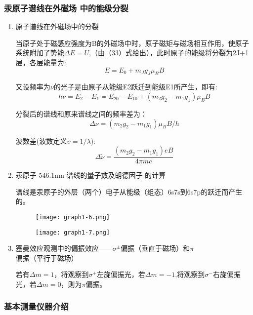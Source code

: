 \documentclass[dvipsnames, svgnames,a4paper,11pt]{article}
\begin{document}
	\subsubsection{汞原子谱线在外磁场 中的能级分裂}

		\begin{enumerate}
			\item 原子谱线在外磁场中的分裂

				当原子处于磁感应强度为B的外磁场中时，原子磁矩与磁场相互作用，使原子系统附加了势能$\Delta E=U$,（由（33）式给出），此时原子的能级将分裂为2J+1层，各层能量为:
				\[
					E = E_0 +m_J g_J \mu_B B
				\]

				又设频率为$\nu$的光子是由原子从能级E2跃迁到能级E1所产生，即有:
				\[
					h\nu = E_2 - E_1 = E_{20} - E_{10} + (m_2 g_2 -m_1 g_1)\mu_B B	
				\]

				分裂后的谱线和原来谱线之间的频率差为：
				\[
					\Delta \nu = (m_2 g_2 -m_1 g_1)\mu_B B / h
				\]

				波数差(波数定义$\widetilde{\upsilon}=1/\lambda$):
				\[
					\Delta \tilde{\nu} = \frac{(m_2 g_2 - m_1 g_1)eB}{4 \pi m c} 	
				\]

			\item 汞原子 546.1nm 谱线的量子数及朗德因子 的计算
			
				谱线是汞原子的外层（两个）电子从能级（组态）6s7s到6s7p的跃迁而产生的。 

					\begin{figure}[H]
						\centering
						\texttt{[image: graph1-6.png]}
						\label{fig:graph1-6}
					\end{figure}

					\begin{figure}[H]
						\centering
						\texttt{[image: graph1-7.png]}
						\label{fig:graph1-7}
					\end{figure}
				
			\item 塞曼效应观测中的偏振效应——$\sigma^\pm$偏振（垂直于磁场）和$\pi$偏振（平行于磁场）
			
				若有$\Delta m = 1$，将观察到$\sigma^+$左旋偏振光，若$\Delta m = -1$,将观察到$\sigma^-$右旋偏振光，若$\Delta m = 0$，则为$\pi$偏振。
		\end{enumerate}	





	\subsubsection{基本测量仪器介绍}
\end{document}
